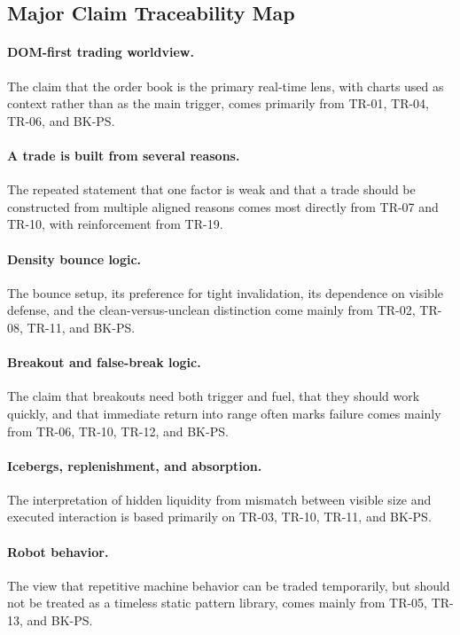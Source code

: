 \subsection{Major Claim Traceability Map}

\paragraph{DOM-first trading worldview.}
The claim that the order book is the primary real-time lens, with charts used as context rather than as the main trigger, comes primarily from TR-01, TR-04, TR-06, and BK-PS.

\paragraph{A trade is built from several reasons.}
The repeated statement that one factor is weak and that a trade should be constructed from multiple aligned reasons comes most directly from TR-07 and TR-10, with reinforcement from TR-19.

\paragraph{Density bounce logic.}
The bounce setup, its preference for tight invalidation, its dependence on visible defense, and the clean-versus-unclean distinction come mainly from TR-02, TR-08, TR-11, and BK-PS.

\paragraph{Breakout and false-break logic.}
The claim that breakouts need both trigger and fuel, that they should work quickly, and that immediate return into range often marks failure comes mainly from TR-06, TR-10, TR-12, and BK-PS.

\paragraph{Icebergs, replenishment, and absorption.}
The interpretation of hidden liquidity from mismatch between visible size and executed interaction is based primarily on TR-03, TR-10, TR-11, and BK-PS.

\paragraph{Robot behavior.}
The view that repetitive machine behavior can be traded temporarily, but should not be treated as a timeless static pattern library, comes mainly from TR-05, TR-13, and BK-PS.

